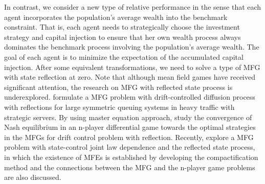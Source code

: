 \documentclass[11pt,times,letter]{article}
\numberwithin{equation}{section}
\begin{document}
In contrast, we consider a new type of relative performance in the sense that each agent incorporates the population's average wealth into the benchmark constraint. That is, each agent needs to strategically choose the investment strategy and capital injection to ensure that her own wealth process always dominates the benchmark process involving the population's average wealth. The goal of each agent is to minimize the expectation of the accumulated capital injection. After some equivalent transformations, we need to solve a type of MFG with state reflection at zero. Note that although mean field games have received significant attention, the research on MFG with reflected state process is underexplored. \cite{Bayraktar2019} formulate a MFG problem with drift-controlled diffusion process with reflections for large symmetric queuing systems in heavy traffic with strategic servers. By using master equation approach,  \cite{Ricciardi2023} study the convergence of Nash equilibrium in an n-player differential game towards the optimal strategies in the MFGs for drift control problem with reflection. Recently,  \cite{BWY25} explore a MFG problem with state-control joint law dependence and the reflected state process, in which the existence of MFEs is established by developing the compactification method and the connections between the MFG and the n-player game problems are also discussed.  
\end{document}
